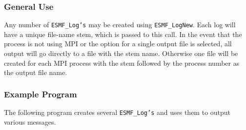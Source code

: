 \subsubsection{General Use}

Any number of {\tt ESMF\_Log's} may be created using {\tt ESMF\_LogNew}.  Each
log will have a unique file-name stem, which is passed to this call.  In the event that
the process is not using MPI or the option for a single output file is selected, all
output will go directly to a file with the stem name.  Otherwise one file will be
created for each MPI process with the stem followed by the process number as the 
output file name.



\subsubsection{Example Program}

The following program creates several {\tt ESMF\_Log's} and uses them to
output various messages.

